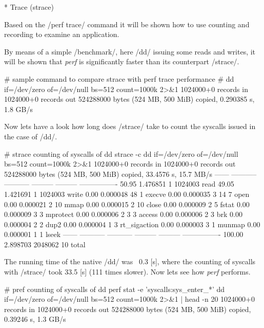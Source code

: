 * Trace (strace)

Based on the /perf trace/ command it will be shown how to use counting
and recording to examine an application.

By means of a simple /benchmark/, here /dd/ issuing some reads and
writes, it will be shown that {\em perf} is significantly faster than its
counterpart /strace/.

\starttyping
# sample command to compare strace with perf trace performance
# dd if=/dev/zero of=/dev/null bs=512 count=1000k 2>&1
1024000+0 records in
1024000+0 records out
524288000 bytes (524 MB, 500 MiB) copied, 0.290385 s, 1.8 GB/s
\stoptyping

Now lets have a look how long does /strace/ take to count
the syscalls issued in the case of /dd/.

\starttyping
# strace counting of syscalls of dd
strace -c dd if=/dev/zero of=/dev/null bs=512 count=1000k 2>&1
1024000+0 records in
1024000+0 records out
524288000 bytes (524 MB, 500 MiB) copied, 33.4576 s, 15.7 MB/s
------ ----------- ----------- --------- --------- ----------------
 50.95    1.476851           1   1024003           read
 49.05    1.421691           1   1024003           write
  0.00    0.000048          48         1           execve
  0.00    0.000035           3        14         7 open
  0.00    0.000021           2        10           mmap
  0.00    0.000015           2        10           close
  0.00    0.000009           2         5           fstat
  0.00    0.000009           3         3           mprotect
  0.00    0.000006           2         3         3 access
  0.00    0.000006           2         3           brk
  0.00    0.000004           2         2           dup2
  0.00    0.000004           1         3           rt_sigaction
  0.00    0.000003           3         1           munmap
  0.00    0.000001           1         1           lseek
------ ----------- ----------- --------- --------- ----------------
100.00    2.898703               2048062        10 total
\stoptyping

The running time of the native /dd/ was ~0.3 [s], where the counting
of syscalls with /strace/ took 33.5 [s] (111 times slower). Now lets
see how {\em perf} performs.

\starttyping
# pref  counting of syscalls of dd
perf stat -e 'syscalls:sys_enter_*' dd if=/dev/zero of=/dev/null bs=512 count=1000k 2>&1 | head -n 20
1024000+0 records in
1024000+0 records out
524288000 bytes (524 MB, 500 MiB) copied, 0.39246 s, 1.3 GB/s

